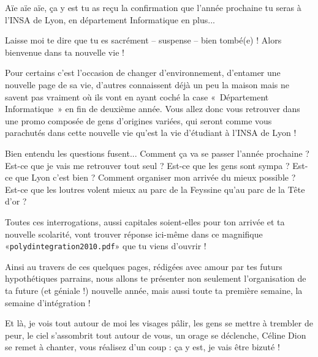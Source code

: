 Aïe aïe aïe, ça y est tu as reçu la confirmation que l'année prochaine tu seras à l'INSA de Lyon, en département Informatique en plus...

\vspace{1em}

Laisse moi te dire que tu es sacrément -- suspense -- bien tombé(e) ! Alors
bienvenue dans ta nouvelle vie !


\vspace{1em}

Pour certains c'est l'occasion de changer d'environnement, d'entamer une
nouvelle page de sa vie,  d'autres connaissent déjà un peu la maison mais
ne savent pas vraiment où ils vont en ayant coché la case «~Département
Informatique~» en fin de deuxième année. Vous allez donc vous retrouver dans
une promo composée de gens d'origines variées, qui seront comme vous parachutés
dans cette nouvelle vie qu'est la vie d'étudiant à l'INSA de Lyon !


\vspace{1em}

Bien entendu les questions fusent... Comment ça va se passer l'année
prochaine ? Est-ce que je vais me retrouver tout seul ?  Est-ce que les gens
sont sympa ? Est-ce que  Lyon c'est bien ? Comment organiser mon arrivée du
mieux possible ? Est-ce que les loutres volent mieux au parc de la Feyssine
qu'au parc de la Tête d'or ?


\vspace{1em}

Toutes ces interrogations, aussi capitales soient-elles pour ton arrivée et ta
nouvelle scolarité, vont trouver réponse ici-même dans ce magnifique
«\texttt{polydintegration2010.pdf}» que tu viens d'ouvrir ! 


\vspace{1em}

Ainsi au travers de ces quelques pages, rédigées avec amour par tes futurs
hypothétiques parrains, nous allons te présenter non seulement l'organisation
de ta future (et géniale !) nouvelle année, mais aussi toute ta première
semaine, la semaine d'intégration  !


\vspace{1em}

Et là, je vois tout autour de moi les visages pâlir, les gens se mettre à
trembler de peur, le ciel s'assombrit tout autour de vous, un orage se
déclenche, Céline Dion se remet à chanter, vous réalisez d'un coup : ça y est,
je vais être bizuté !


\vspace{1em}

